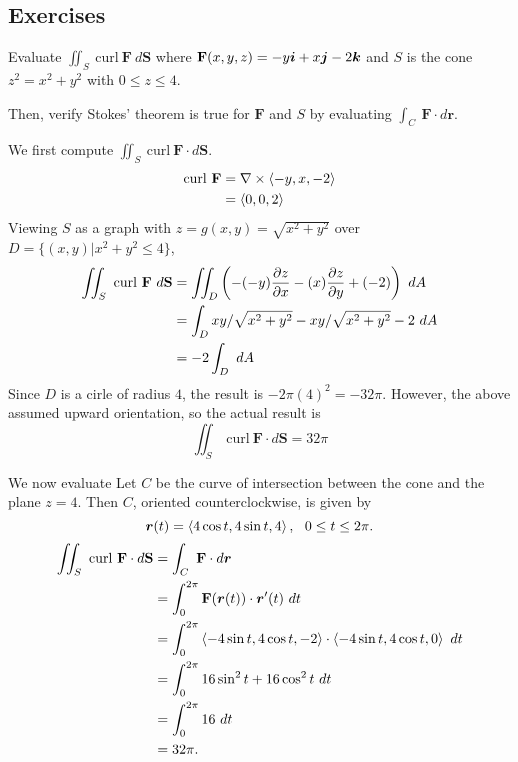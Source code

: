 \documentclass[12pt]{exam}
\newcommand{\mbf}{\mathbf{F}}
\begin{document}
\subsection*{Exercises}
\begin{questions}

\question 
    Evaluate \(\iint_S~\mathrm{curl}~\mbf~d\mathbf{S}\) where
    \(\mbf(x,y,z)=-y\bi+x\bj-2\bk\) and \(S\) is the cone \(z^2=x^2+y^2\) with \(0\le z\le 4\).

    Then, verify Stokes' theorem is true for \(\mbf\) and \(S\) by evaluating \(\int_C~\mbf\cdot d\bm{r}\).
    \ifprintanswers

        \begin{solution}
        We first compute \(\iint_S~\mathrm{curl}~\mathbf{F}\cdot d \mathbf{S}\).
        \begin{align*}
            \mathrm{curl}~\mbf & = \nabla\times\gen{-y,x,-2}\\
                & = \gen{0,0,2}
        \end{align*}
        Viewing \(S\) as a graph with \(z=g(x,y)=\sqrt{x^2+y^2}\) over \(D=\{(x,y)|x^2+y^2\le 4\}\),
        \begin{align*}
            \iint_S~\mathrm{curl}~\mbf~d\mathbf{S} & = \iint_D \left(-(-y)\pd{z}{x}-(x)\pd{z}{y}+(-2)\right)~dA\\
                & = \int_D xy/\sqrt{x^2+y^2}-xy/\sqrt{x^2+y^2}-2~dA\\
                & = -2\int_D~dA
        \end{align*}
        Since \(D\) is a cirle of radius \(4\), the result is \(-2\pi(4)^2=-32\pi\). However, the above assumed upward orientation, so the actual result is
        \[
            \boxed{\iint_S~\mathrm{curl}~\mathbf{F}\cdot d \mathbf{S} = 32\pi}
        \]


        We now evaluate 
        Let \(C\) be the curve of intersection between the cone and the plane \(z=4\).
        Then \(C\), oriented counterclockwise, is given by 
        \[
            \bm{r}(t) = \left\langle 4\cos t,4\sin t,4 \right\rangle,~~0\le t\le 2\pi.
        \]
        \begin{align*}
            \iint_S~\mathrm{curl}~\mathbf{F}\cdot d\mathbf{S} & = \int_C~\mbf\cdot d\bm{r}\\
                & = \int_0^{2\pi} \mbf(\bm{r}(t))\cdot \bm{r}'(t)~dt\\
                & = \int_0^{2\pi} \gen{-4\sin t,4\cos t,-2}\cdot \gen{-4\sin t,4\cos t,0}~dt\\
                & = \int_0^{2\pi} 16\sin^2t+16\cos^2t~dt \\
                & = \int_0^{2\pi}16~dt\\
                & = 32\pi.
        \end{align*}


\end{solution}
\end{questions}
\end{document}
